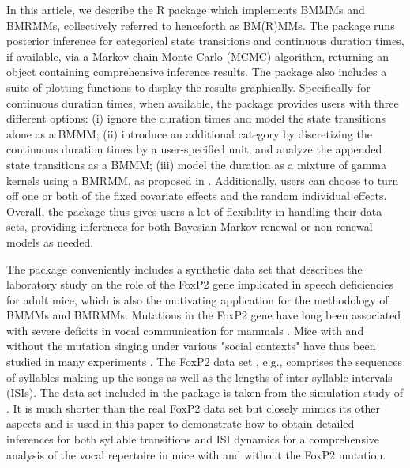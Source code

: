 In this article, we describe the R package  which implements BMMMs and BMRMMs, collectively referred to henceforth as BM(R)MMs. 
The  package runs posterior inference for categorical state transitions and continuous duration times, if available, 
via a Markov chain Monte Carlo (MCMC) algorithm, returning an object containing comprehensive inference results. 
The package also includes a suite of plotting functions to display the results graphically. 
Specifically for continuous duration times, when available, the package provides users with three different options: (i)
ignore the duration times and model the state transitions alone as a BMMM; 
(ii) introduce an additional category by discretizing the continuous duration times by a user-specified unit, 
and analyze the appended state transitions as a BMMM; 
(iii) model the duration as a mixture of gamma kernels using a BMRMM, as proposed in \citet{wu2021bayesian}. 
Additionally,  users can choose to turn off one or both of the fixed covariate effects and the random individual effects. 
Overall, the  package thus gives users a lot of flexibility in handling their data sets, 
providing inferences for both Bayesian Markov renewal or non-renewal models as needed.
 




The  package conveniently includes a synthetic  data set that describes the laboratory study on the role of the FoxP2 gene implicated in speech deficiencies for adult mice,  which is also the motivating application for the methodology of BMMMs and BMRMMs.  
Mutations in the FoxP2 gene have long been associated with  severe deficits in vocal communication for mammals  \citep{macdermot2005identification}. 
Mice with and without the mutation singing under various "social contexts" have thus been studied in many experiments \citep{Fujita_etal:2008,Castellucci_etal:2016,Gaub_etal:2016,Chabout_etal:2016}. 
The FoxP2 data set \citep{Chabout_etal:2016}, e.g., comprises the sequences of syllables making up the songs as well as the lengths of inter-syllable intervals (ISIs). 
The data set  included in the  package is taken from the simulation study of \cite{wu2021bayesian}. 
It is much shorter than the real FoxP2 data set but closely mimics its other aspects and is used in this paper to demonstrate how to obtain detailed inferences for both syllable transitions and ISI dynamics for a comprehensive analysis of the vocal repertoire in mice with and without the FoxP2 mutation.


